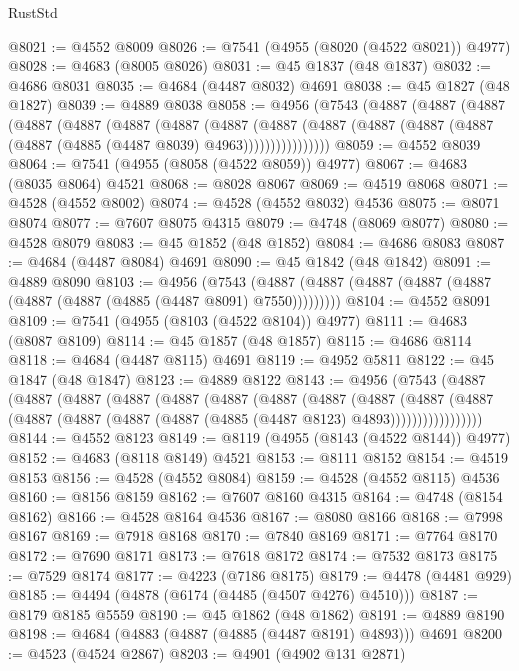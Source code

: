 \begin{lexlean}{RustStd}
\begin{coremodule}
@8021 := @4552 @8009
@8026 := @7541 (@4955 (@8020 (@4522 @8021)) @4977)
@8028 := @4683 (@8005 @8026)
@8031 := @45 @1837 (@48 @1837)
@8032 := @4686 @8031
@8035 := @4684 (@4487 @8032) @4691
@8038 := @45 @1827 (@48 @1827)
@8039 := @4889 @8038
@8058 := @4956
    (@7543
      (@4887
        (@4887
          (@4887
            (@4887
              (@4887
                (@4887
                  (@4887
                    (@4887
                      (@4887
                        (@4887
                          (@4887 (@4887 (@4887 (@4887 (@4885 (@4487 @8039) @4963))))))))))))))))
@8059 := @4552 @8039
@8064 := @7541 (@4955 (@8058 (@4522 @8059)) @4977)
@8067 := @4683 (@8035 @8064) @4521
@8068 := @8028 @8067
@8069 := @4519 @8068
@8071 := @4528 (@4552 @8002)
@8074 := @4528 (@4552 @8032) @4536
@8075 := @8071 @8074
@8077 := @7607 @8075 @4315
@8079 := @4748 (@8069 @8077)
@8080 := @4528 @8079
@8083 := @45 @1852 (@48 @1852)
@8084 := @4686 @8083
@8087 := @4684 (@4487 @8084) @4691
@8090 := @45 @1842 (@48 @1842)
@8091 := @4889 @8090
@8103 := @4956
    (@7543 (@4887 (@4887 (@4887 (@4887 (@4887 (@4887 (@4887 (@4885 (@4487 @8091) @7550)))))))))
@8104 := @4552 @8091
@8109 := @7541 (@4955 (@8103 (@4522 @8104)) @4977)
@8111 := @4683 (@8087 @8109)
@8114 := @45 @1857 (@48 @1857)
@8115 := @4686 @8114
@8118 := @4684 (@4487 @8115) @4691
@8119 := @4952 @5811
@8122 := @45 @1847 (@48 @1847)
@8123 := @4889 @8122
@8143 := @4956
    (@7543
      (@4887
        (@4887
          (@4887
            (@4887
              (@4887
                (@4887
                  (@4887
                    (@4887
                      (@4887
                        (@4887
                          (@4887
                            (@4887 (@4887 (@4887 (@4887 (@4885 (@4487 @8123) @4893)))))))))))))))))
@8144 := @4552 @8123
@8149 := @8119 (@4955 (@8143 (@4522 @8144)) @4977)
@8152 := @4683 (@8118 @8149) @4521
@8153 := @8111 @8152
@8154 := @4519 @8153
@8156 := @4528 (@4552 @8084)
@8159 := @4528 (@4552 @8115) @4536
@8160 := @8156 @8159
@8162 := @7607 @8160 @4315
@8164 := @4748 (@8154 @8162)
@8166 := @4528 @8164 @4536
@8167 := @8080 @8166
@8168 := @7998 @8167
@8169 := @7918 @8168
@8170 := @7840 @8169
@8171 := @7764 @8170
@8172 := @7690 @8171
@8173 := @7618 @8172
@8174 := @7532 @8173
@8175 := @7529 @8174
@8177 := @4223 (@7186 @8175)
@8179 := @4478 (@4481 @929)
@8185 := @4494 (@4878 (@6174 (@4485 (@4507 @4276) @4510)))
@8187 := @8179 @8185 @5559
@8190 := @45 @1862 (@48 @1862)
@8191 := @4889 @8190
@8198 := @4684 (@4883 (@4887 (@4885 (@4487 @8191) @4893))) @4691
@8200 := @4523 (@4524 @2867)
@8203 := @4901 (@4902 @131 @2871)

\end{coremodule}
\end{lexlean}

